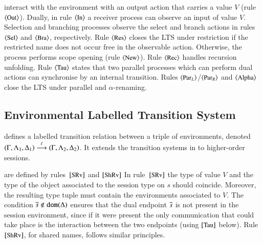 interact with the environment with an output action that carries a value
$V$ (rule~$\ltsrule{Out}$).  Dually, in rule $\ltsrule{In}$ a
receiver process can observe an input of  value $V$.
Selection and branching processes observe the select and branch
actions in rules $\ltsrule{Sel}$ and $\ltsrule{Bra}$, respectively.
Rule $\ltsrule{Res}$ closes the LTS under restriction 
if the restricted name does not occur free in the
observable action. 
Otherwise, 
the process performs scope opening (rule $\ltsrule{New}$).  
Rule $\ltsrule{Rec}$ handles recursion unfolding.
Rule $\ltsrule{Tau}$ 
states that two parallel processes which can perform
dual actions can synchronise by an internal transition.
Rules $\ltsrule{Par${}_L$}$/$\ltsrule{Par${}_R$}$ 
and $\ltsrule{Alpha}$ close the LTS
under parallel  and $\alpha$-renaming. 

\subsection{Environmental Labelled Transition System}
\label{ss:elts}
\noi 
{}
defines a labelled transition relation between 
a triple of environments, 
denoted
$(\Gamma, \Lambda_1, \Delta_1) \stackrel{\ell}{\longrightarrow} (\Gamma, \Lambda_2, \Delta_2)$.
It extends the transition systems
in \cite{KYHH2015,KY2015} 
to higher-order sessions. 

are defined by 
rules~$\eltsrule{SRv}$ and $\eltsrule{ShRv}$
In rule~$\eltsrule{SRv}$
the type of value $V$
and the type of the object associated to the session type on $s$ 
should coincide. 
Moreover, 
the resulting type tuple must contain the environments 
associated to $V$. 
The condition $\overline{s} \notin \mathtt{dom}(\Delta)$
ensures that 
the dual endpoint $\overline{s}$ is not 
present in the session environment, since if it were present
the only communication that could take place is the interaction
between the two endpoints (using $\eltsrule{Tau}$ below).
Rule~$\eltsrule{ShRv}$, for shared names, follows similar principles.

